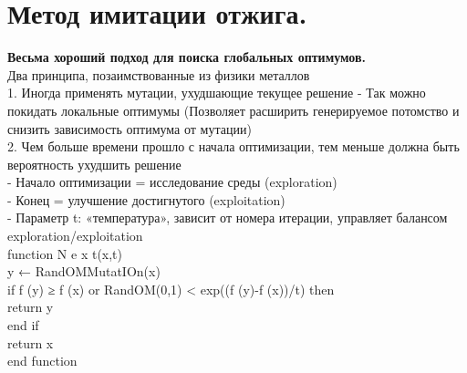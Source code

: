 \newcommand\tab[1][1cm]{\hspace*{#1}}
\section{Метод имитации отжига.}
\textbf{Весьма хороший подход для поиска глобальных оптимумов.}\\
Два принципа, позаимствованные из физики металлов \\
1. Иногда применять мутации, ухудшающие текущее решение
- Так можно покидать локальные оптимумы (Позволяет расширить генерируемое потомство и снизить зависимость оптимума от мутации)\\
2. Чем больше времени прошло с начала оптимизации, тем меньше должна быть вероятность ухудшить решение \\
- Начало оптимизации = исследование среды (exploration) \\
- Конец = улучшение достигнутого (exploitation) \\
- Параметр t: «температура», зависит от номера итерации, управляет балансом exploration/exploitation \\

function N e x t(x,t)  \\
\tab y ← RandOMMutatIOn(x)  \\ 
\tab if f (y) ≥ f (x) or RandOM(0,1) < exp((f (y)-f (x))/t) then \\ 
\tab \tab return y  \\
\tab end if  \\
\tab return x  \\
end function \\
